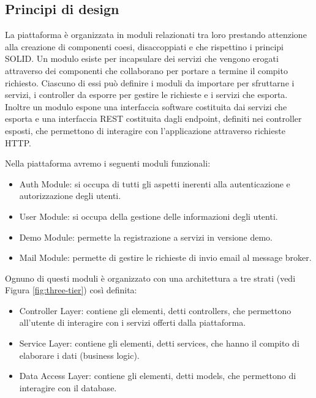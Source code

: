 \subsection{Principi di design}
La piattaforma è organizzata in moduli relazionati tra loro prestando attenzione
alla creazione di componenti coesi, disaccoppiati e che rispettino i principi SOLID.
Un modulo esiste per incapsulare dei servizi che vengono erogati attraverso dei componenti
che collaborano per portare a termine il compito richiesto. Ciascuno di essi può definire i moduli da importare per sfruttarne i servizi, i controller da esporre per gestire le richieste e i servizi che esporta.
Inoltre un modulo espone una interfaccia software costituita dai servizi che esporta e una interfaccia REST costituita dagli endpoint, definiti nei controller esposti,
che permettono di interagire con l'applicazione attraverso richieste HTTP.

Nella piattaforma avremo i seguenti moduli funzionali:
\begin{itemize}
    \itemsep0em
    \item Auth Module: si occupa di tutti gli aspetti inerenti alla autenticazione e autorizzazione degli utenti.
    \item User Module: si occupa della gestione delle informazioni degli utenti.
    \item Demo Module: permette la registrazione a servizi in versione demo.
    \item Mail Module: permette di gestire le richieste di invio email al message broker.
\end{itemize}
Ognuno di questi moduli è organizzato con una architettura a tre strati (vedi Figura \ref{fig:three-tier}) così definita:
\begin{itemize}
    \itemsep0em
    \item Controller Layer: contiene gli elementi, detti controllers, che permettono all'utente di interagire con i servizi offerti dalla piattaforma.
    \item Service Layer: contiene gli elementi, detti services, che hanno il compito di elaborare i dati (business logic).
    \item Data Access Layer: contiene gli elementi, detti models, che permettono di interagire con il database.
\end{itemize}

